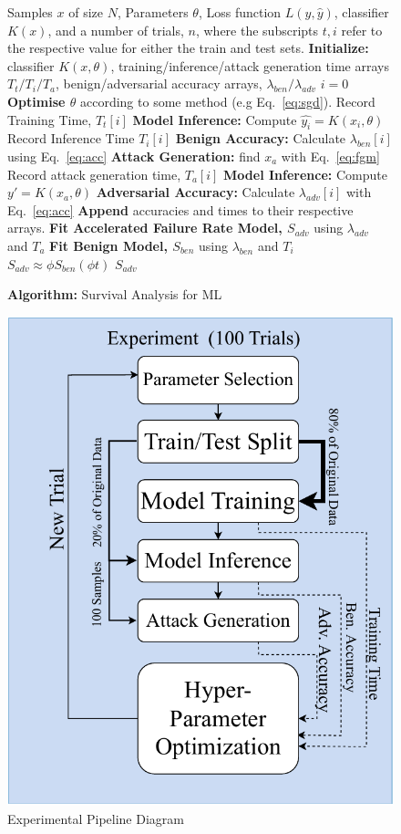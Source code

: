 \documentclass[conference]{IEEEtran}
\begin{document}
\begin{figure}[h!]
    \caption{\textbf{Algorithm: }Survival Analysis for ML}
    \label{fig:alg}
\begin{algorithmic}
    \Require Samples $x $ of size $N$, Parameters $\theta$, Loss function $L(y, \hat{y})$, classifier $K(x)$, and a number of trials, $n$, where the subscripts $t,i$ refer to the respective value for either the train and test sets.
    \State \textbf{Initialize:} classifier $K(x, \theta)$, training/inference/attack generation time arrays $T_t/T_i/T_a$, benign/adversarial accuracy arrays, $\lambda_{ben}/ \lambda_{adv}$
    \State $i = 0$
    \State \textbf{Optimise $\theta$} according to some method (e.g Eq.~\ref{eq:sgd}).
    \State Record Training Time, $ T_t[i] $
    \State \textbf{Model Inference:} Compute $ \hat{y_i} = K(x_i, \theta) $
    \State Record Inference Time $ T_i[i] $
    \State \textbf{Benign Accuracy:} Calculate $\lambda_{ben}[i]$ using Eq.~\ref{eq:acc}
    \State \textbf{Attack Generation: } find $x_a$ with Eq.~\ref{eq:fgm}
    \State Record attack generation time, $T_a[i]$
    \State \textbf{Model Inference:} Compute $ y' = K(x_a, \theta) $
    \State \textbf{Adversarial Accuracy:} Calculate $\lambda_{adv}[i]$ with Eq.~\ref{eq:acc}
    \State \textbf{Append} accuracies and times to their respective arrays.
    \EndWhile
    \State \textbf{Fit Accelerated Failure Rate Model, $S_{adv}$} using $\lambda_{adv}$ and $T_a$
    \State \textbf{Fit Benign Model, $S_{ben}$} using $\lambda_{ben}$ and $T_i$
    \Ensure$ S_{adv} \approx  \phi S_{ben}(\phi t)$
    \Return $S_{adv}$
\end{algorithmic}
\end{figure}


\begin{figure}
    \centering
    \includegraphics[width=.35\textwidth]{plots/experiment.pdf}
    \caption{Experimental Pipeline Diagram}
    \label{fig:experiments}
\end{figure}
\end{document}
